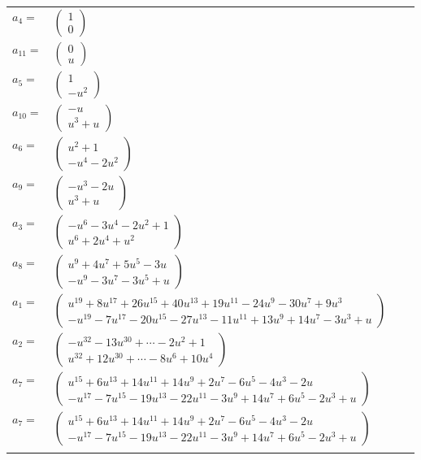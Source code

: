 \documentclass[1p]{elsarticle_modified}
\theoremstyle{definition}
\begin{document}
\begin{tabular}{m{7pt} m{180pt} m{7pt} m{180pt} }
\flushright $a_{4}=$&$\begin{pmatrix}1\\0\end{pmatrix}$ \\
\flushright $a_{11}=$&$\begin{pmatrix}0\\u\end{pmatrix}$ \\
\flushright $a_{5}=$&$\begin{pmatrix}1\\- u^2\end{pmatrix}$ \\
\flushright $a_{10}=$&$\begin{pmatrix}- u\\u^3+u\end{pmatrix}$ \\
\flushright $a_{6}=$&$\begin{pmatrix}u^2+1\\- u^4-2 u^2\end{pmatrix}$ \\
\flushright $a_{9}=$&$\begin{pmatrix}- u^3-2 u\\u^3+u\end{pmatrix}$ \\
\flushright $a_{3}=$&$\begin{pmatrix}- u^6-3 u^4-2 u^2+1\\u^6+2 u^4+u^2\end{pmatrix}$ \\
\flushright $a_{8}=$&$\begin{pmatrix}u^9+4 u^7+5 u^5-3 u\\- u^9-3 u^7-3 u^5+u\end{pmatrix}$ \\
\flushright $a_{1}=$&$\begin{pmatrix}u^{19}+8 u^{17}+26 u^{15}+40 u^{13}+19 u^{11}-24 u^9-30 u^7+9 u^3\\- u^{19}-7 u^{17}-20 u^{15}-27 u^{13}-11 u^{11}+13 u^9+14 u^7-3 u^3+u\end{pmatrix}$ \\
\flushright $a_{2}=$&$\begin{pmatrix}- u^{32}-13 u^{30}+\cdots-2 u^2+1\\u^{32}+12 u^{30}+\cdots-8 u^6+10 u^4\end{pmatrix}$ \\
\flushright $a_{7}=$&$\begin{pmatrix}u^{15}+6 u^{13}+14 u^{11}+14 u^9+2 u^7-6 u^5-4 u^3-2 u\\- u^{17}-7 u^{15}-19 u^{13}-22 u^{11}-3 u^9+14 u^7+6 u^5-2 u^3+u\end{pmatrix}$\\ \flushright $a_{7}=$&$\begin{pmatrix}u^{15}+6 u^{13}+14 u^{11}+14 u^9+2 u^7-6 u^5-4 u^3-2 u\\- u^{17}-7 u^{15}-19 u^{13}-22 u^{11}-3 u^9+14 u^7+6 u^5-2 u^3+u\end{pmatrix}$\\&\end{tabular}
\end{document}
